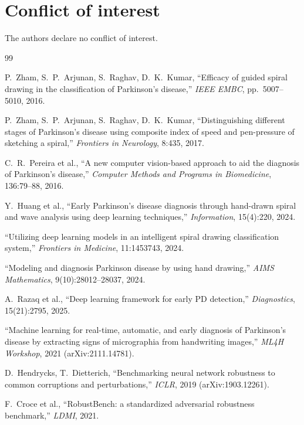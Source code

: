 \documentclass[11pt,a4paper]{article}
\begin{document}
\section*{Conflict of interest}
The authors declare no conflict of interest.

\begin{thebibliography}{99}\small

 P.~Zham, S.~P.~Arjunan, S.~Raghav, D.~K.~Kumar,
``Efficacy of guided spiral drawing in the classification of Parkinson's
disease,'' \emph{IEEE EMBC}, pp.~5007--5010, 2016.

 P.~Zham, S.~P.~Arjunan, S.~Raghav, D.~K.~Kumar,
``Distinguishing different stages of Parkinson's disease using composite
index of speed and pen-pressure of sketching a spiral,'' \emph{Frontiers in
Neurology}, 8:435, 2017.

 C.~R.~Pereira et al., ``A new computer vision-based
approach to aid the diagnosis of Parkinson's disease,'' \emph{Computer
Methods and Programs in Biomedicine}, 136:79--88, 2016.

 Y.~Huang et al., ``Early Parkinson's disease diagnosis
through hand-drawn spiral and wave analysis using deep learning
techniques,'' \emph{Information}, 15(4):220, 2024.

 ``Utilizing deep learning models in an intelligent
spiral drawing classification system,'' \emph{Frontiers in Medicine},
11:1453743, 2024.

 ``Modeling and diagnosis Parkinson disease by using hand
drawing,'' \emph{AIMS Mathematics}, 9(10):28012--28037, 2024.

 A.~Razaq et al., ``Deep learning framework for
early PD detection,'' \emph{Diagnostics}, 15(21):2795, 2025.

 ``Machine learning for real-time, automatic, and early
diagnosis of Parkinson's disease by extracting signs of micrographia from
handwriting images,'' \emph{ML4H Workshop}, 2021 (arXiv:2111.14781).

 D.~Hendrycks, T.~Dietterich, ``Benchmarking neural
network robustness to common corruptions and perturbations,'' \emph{ICLR},
2019 (arXiv:1903.12261).

 F.~Croce et al., ``RobustBench: a standardized
adversarial robustness benchmark,'' \emph{LDMI}, 2021.


\end{thebibliography}
\end{document}
